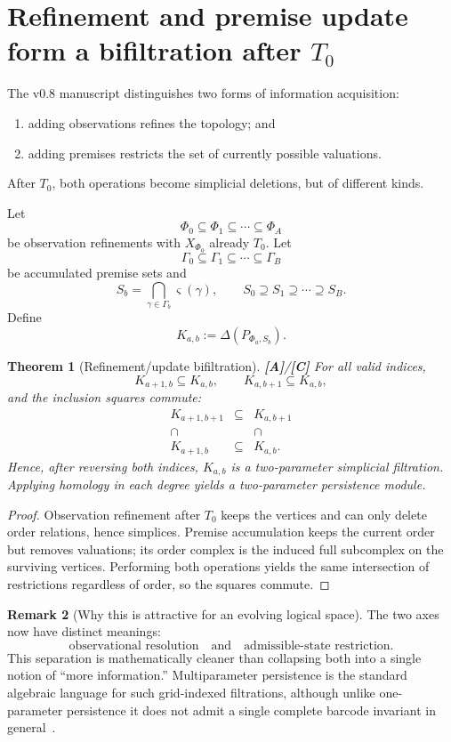 \documentclass[11pt]{article}
\newtheorem{theorem}{Theorem}[section]
\theoremstyle{definition}
\newtheorem{remark}[theorem]{Remark}
\newcommand{\truth}{\varsigma}
\newcommand{\statusA}{\textbf{[A]}}
\newcommand{\statusC}{\textbf{[C]}}
\begin{document}
\section{Refinement and premise update form a bifiltration after $T_0$}

The v0.8 manuscript distinguishes two forms of information acquisition:
\begin{enumerate}[label=(\roman*)]
\item adding observations refines the topology; and
\item adding premises restricts the set of currently possible valuations.
\end{enumerate}
After $T_0$, both operations become simplicial deletions, but of different kinds.

Let
\[
\Phi_0\subseteq\Phi_1\subseteq\cdots\subseteq\Phi_A
\]
be observation refinements with $X_{\Phi_0}$ already $T_0$. Let
\[
\Gamma_0\subseteq\Gamma_1\subseteq\cdots\subseteq\Gamma_B
\]
be accumulated premise sets and
\[
S_b=\bigcap_{\gamma\in\Gamma_b}\truth(\gamma),
\qquad
S_0\supseteq S_1\supseteq\cdots\supseteq S_B.
\]
Define
\[
K_{a,b}:=\Delta(P_{\Phi_a,S_b}).
\]

\begin{theorem}[Refinement/update bifiltration]\label{thm:bifiltration}
\statusA/\statusC\;
For all valid indices,
\[
K_{a+1,b}\subseteq K_{a,b},
\qquad
K_{a,b+1}\subseteq K_{a,b},
\]
and the inclusion squares commute:
\[
\begin{array}{ccc}
K_{a+1,b+1}&\subseteq&K_{a,b+1}\\
\cap&&\cap\\
K_{a+1,b}&\subseteq&K_{a,b}.
\end{array}
\]
Hence, after reversing both indices, $K_{a,b}$ is a two-parameter simplicial filtration. Applying homology in each degree yields a two-parameter persistence module.
\end{theorem}

\begin{proof}
Observation refinement after $T_0$ keeps the vertices and can only delete order relations, hence simplices. Premise accumulation keeps the current order but removes valuations; its order complex is the induced full subcomplex on the surviving vertices. Performing both operations yields the same intersection of restrictions regardless of order, so the squares commute.
\end{proof}

\begin{remark}[Why this is attractive for an evolving logical space]
The two axes now have distinct meanings:
\[
\text{observational resolution}\quad\text{and}\quad\text{admissible-state restriction}.
\]
This separation is mathematically cleaner than collapsing both into a single notion of ``more information.'' Multiparameter persistence is the standard algebraic language for such grid-indexed filtrations, although unlike one-parameter persistence it does not admit a single complete barcode invariant in general~\cite{CarlssonZomorodian2009,BotnanLesnick2022}.
\end{remark}
\end{document}
